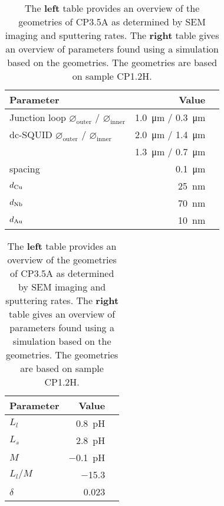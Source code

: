 \begin{table}
	\begin{subtable}{.6\linewidth}
		\begin{tabular}[t]{@{}lrr@{}}
			\toprule
			Parameter & Value \\ \midrule
			Junction loop $\diameter_{\text{outer}}$ / $\diameter_{\text{inner}}$ & \qty{1.0}{\micro\meter} / \qty{0.3}{\micro\meter} \\
			dc-SQUID $\diameter_{\text{outer}}$ / $\diameter_{\text{inner}}$ & \qty{2.0}{\micro\meter} / \qty{1.4}{\micro\meter} \\
			                                                                 & \qty{1.3}{\micro\meter} / \qty{0.7}{\micro\meter} \\
			spacing & \qty{0.1}{\micro\meter} \\
			$d_{\ce{Cu}}$ & \qty{25}{\nano\meter} \\
			$d_{\ce{Nb}}$ & \qty{70}{\nano\meter} \\
			$d_{\ce{Au}}$ & \qty{10}{\nano\meter} \\
			\bottomrule
		\end{tabular}
    \end{subtable}
    \hfill
    \begin{subtable}{.3\linewidth}
    	\flushright
    	\begin{tabular}[t]{@{}lrr@{}}
    		\toprule
    		Parameter & Value \\ \midrule
    		$L_{l}$ & \qty{0.8}{\pico\henry} \\
			$L_{s}$ & \qty{2.8}{\pico\henry} \\
			$M$ & \qty{-0.1}{\pico\henry} \\
			$L_{l} / M$ & \num{-15.3} \\
			$\delta$ & \num{0.023} \\
    		\bottomrule
    	\end{tabular}
    \end{subtable}
    \caption{The \textbf{left} table provides an overview of the geometries of CP3.5A as determined by SEM imaging and sputtering rates. The \textbf{right} table gives an overview of parameters found using a simulation based on the geometries. The geometries are based on sample CP1.2H.}
    \label{tab:CP3.5A-geometries}
\end{table}